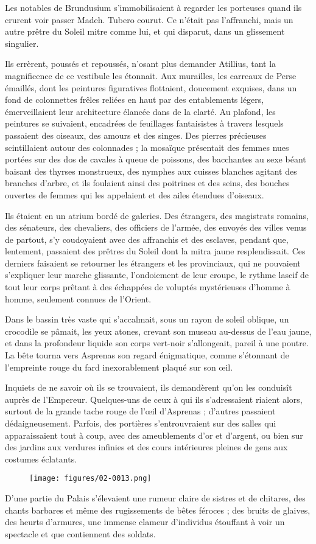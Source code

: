 \documentclass[a4paper, 11pt, oneside, polutonikogreek, french]{article}
\begin{document}
Les notables de Brundusium s'immobilisaient à regarder les porteuses quand ils crurent voir passer Madeh. Tubero courut. Ce n'était pas l'affranchi, mais un autre prêtre du Soleil mitre comme lui, et qui disparut, dans un glissement singulier.

Ils errèrent, poussés et repoussés, n'osant plus demander Atillius, tant la magnificence de ce vestibule les étonnait. Aux murailles, les carreaux de Perse émaillés, dont les peintures figuratives flottaient, doucement exquises, dans un fond de colonnettes frêles reliées en haut par des entablements légers, émerveillaient leur architecture élancée dans de la clarté. Au plafond, les peintures se suivaient, encadrées de feuillages fantaisistes à travers lesquels passaient des oiseaux, des amours et des singes. Des pierres précieuses scintillaient autour des colonnades ; la mosaïque présentait des femmes nues portées sur des dos de cavales à queue de poissons, des bacchantes au sexe béant baisant des thyrses monstrueux, des nymphes aux cuisses blanches agitant des branches d'arbre, et ils foulaient ainsi des poitrines et des seins, des bouches ouvertes de femmes qui les appelaient et des ailes étendues d'oiseaux.

Ils étaient en un atrium bordé de galeries. Des étrangers, des magistrats romains, des sénateurs, des chevaliers, des officiers de l'armée, des envoyés des villes venus de partout, s'y coudoyaient avec des affranchis et des esclaves, pendant que, lentement, passaient des prêtres du Soleil dont la mitra jaune resplendissait. Ces derniers faisaient se retourner les étrangers et les provinciaux, qui ne pouvaient s'expliquer leur marche glissante, l'ondoiement de leur croupe, le rythme lascif de tout leur corps prêtant à des échappées de voluptés mystérieuses d'homme à homme, seulement connues de l'Orient.

Dans le bassin très vaste qui s'accalmait, sous un rayon de soleil oblique, un crocodile se pâmait, les yeux atones, crevant son museau au-dessus de l'eau jaune, et dans la profondeur liquide son corps vert-noir s'allongeait, pareil à une poutre. La bête tourna vers Asprenas son regard énigmatique, comme s'étonnant de l'empreinte rouge du fard inexorablement plaqué sur son œil.

Inquiets de ne savoir où ils se trouvaient, ils demandèrent qu'on les conduisît auprès de l'Empereur. Quelques-uns de ceux à qui ils s'adressaient riaient alors, surtout de la grande tache rouge de l'œil d'Asprenas ; d'autres passaient dédaigneusement. Parfois, des portières s'entrouvraient sur des salles qui apparaissaient tout à coup, avec des ameublements d'or et d'argent, ou bien sur des jardins aux verdures infinies et des cours intérieures pleines de gens aux costumes éclatants.
\begin{figure}[H]
\centering
\texttt{[image: figures/02-0013.png]}
\end{figure}
D'une partie du Palais s'élevaient une rumeur claire de sistres et de chitares, des chants barbares et même des rugissements de bêtes féroces ; des bruits de glaives, des heurts d'armures, une immense clameur d'individus étouffant à voir un spectacle et que contiennent des soldats.
\end{document}
